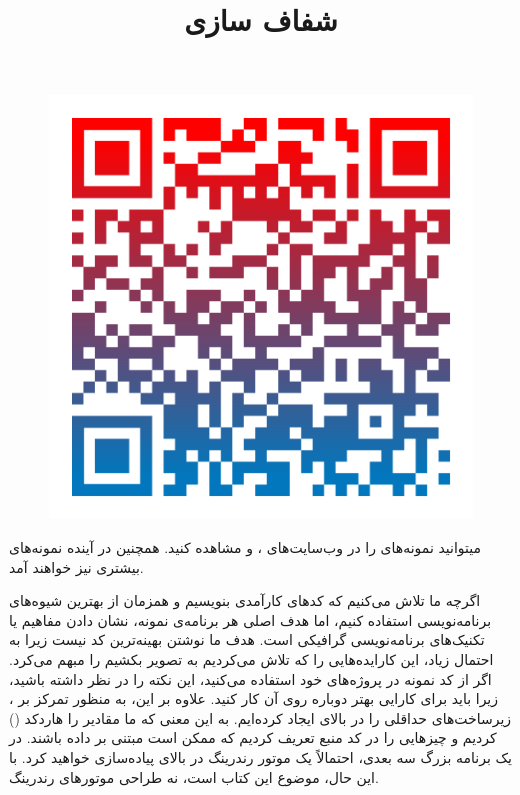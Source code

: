 {    \begin{figure}[H]
        \centering
        \setlength{\belowcaptionskip}{-10pt}
        \includegraphics[scale=0.15]{Images/1.Intro.0.2.png}
        \caption*{\Large {}}
    \end{figure}

    میتوانید نمونه‌های  را در وب‌سایت‌های ،  و  مشاهده کنید. همچنین در آینده نمونه‌های بیشتری نیز خواهند آمد.
}
\textbf{\vspace{25pt}}

\title{
    \LARGE
    \textbf{شفاف سازی}
} \rullFillWithLine[0.5em]{1pt}
\textbf{\vspace{12pt}}

{
    \Large
    اگرچه ما تلاش می‌کنیم که کد‌های کارآمدی بنویسیم و همزمان از بهترین شیوه‌های برنامه‌نویسی  استفاده کنیم، اما هدف اصلی هر برنامه‌ی نمونه، نشان دادن مفاهیم  یا تکنیک‌های برنامه‌نویسی گرافیکی است.
    هدف ما نوشتن بهینه‌ترین کد نیست زیرا به احتمال زیاد، این کار‌ایده‌هایی را که تلاش می‌کردیم به تصویر بکشیم را مبهم می‌کرد.
    اگر از کد نمونه در پروژه‌های خود استفاده می‌کنید، این نکته را در نظر داشته باشید، زیرا باید برای کارایی بهتر دوباره روی آن کار کنید.
    علاوه بر این، به منظور تمرکز بر ، زیرساخت‌های حداقلی را در بالای  ایجاد کرده‌ایم. به این معنی که ما مقادیر را هاردکد () کردیم و چیز‌هایی را در کد منبع تعریف کردیم که ممکن است مبتنی بر داده باشند.
در یک برنامه بزرگ سه بعدی، احتمالاً یک موتور رندرینگ در بالای  پیاده‌سازی خواهید کرد. با این حال، موضوع این کتاب  است، نه طراحی موتور‌های رندرینگ.
}
\textbf{\vspace{25pt}}

